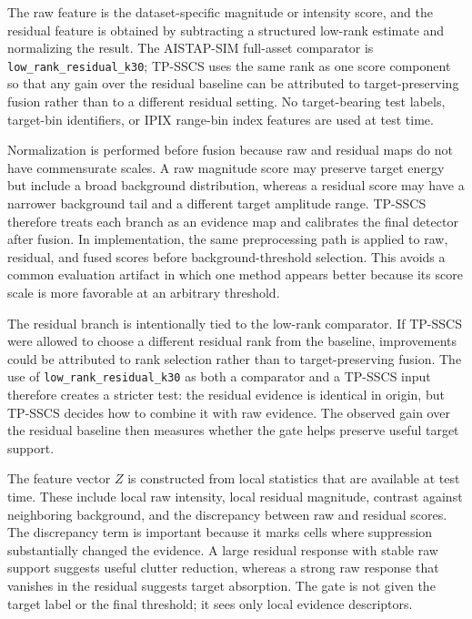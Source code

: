 \documentclass[journal]{IEEEtran}
\begin{document}
The raw feature is the dataset-specific magnitude or intensity score, and the residual feature is obtained by subtracting a structured low-rank estimate and normalizing the result. The AISTAP-SIM full-asset comparator is \texttt{low\_rank\_residual\_k30}; TP-SSCS uses the same rank as one score component so that any gain over the residual baseline can be attributed to target-preserving fusion rather than to a different residual setting. No target-bearing test labels, target-bin identifiers, or IPIX range-bin index features are used at test time.

Normalization is performed before fusion because raw and residual maps do not have commensurate scales. A raw magnitude score may preserve target energy but include a broad background distribution, whereas a residual score may have a narrower background tail and a different target amplitude range. TP-SSCS therefore treats each branch as an evidence map and calibrates the final detector after fusion. In implementation, the same preprocessing path is applied to raw, residual, and fused scores before background-threshold selection. This avoids a common evaluation artifact in which one method appears better because its score scale is more favorable at an arbitrary threshold.

The residual branch is intentionally tied to the low-rank comparator. If TP-SSCS were allowed to choose a different residual rank from the baseline, improvements could be attributed to rank selection rather than to target-preserving fusion. The use of \texttt{low\_rank\_residual\_k30} as both a comparator and a TP-SSCS input therefore creates a stricter test: the residual evidence is identical in origin, but TP-SSCS decides how to combine it with raw evidence. The observed gain over the residual baseline then measures whether the gate helps preserve useful target support.

The feature vector $Z$ is constructed from local statistics that are available at test time. These include local raw intensity, local residual magnitude, contrast against neighboring background, and the discrepancy between raw and residual scores. The discrepancy term is important because it marks cells where suppression substantially changed the evidence. A large residual response with stable raw support suggests useful clutter reduction, whereas a strong raw response that vanishes in the residual suggests target absorption. The gate is not given the target label or the final threshold; it sees only local evidence descriptors.
\end{document}
